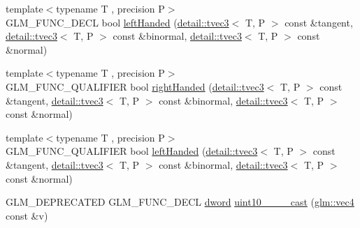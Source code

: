 \begin{DoxyCompactItemize}
\item 
{\footnotesize template$<$typename T , precision P$>$ }\\G\+L\+M\+\_\+\+F\+U\+N\+C\+\_\+\+D\+E\+CL bool \hyperlink{group__gtx__handed__coordinate__space_ga2c0882af0eabd0e39da5680931f586ed}{left\+Handed} (\hyperlink{structglm_1_1detail_1_1tvec3}{detail\+::tvec3}$<$ T, P $>$ const \&tangent, \hyperlink{structglm_1_1detail_1_1tvec3}{detail\+::tvec3}$<$ T, P $>$ const \&binormal, \hyperlink{structglm_1_1detail_1_1tvec3}{detail\+::tvec3}$<$ T, P $>$ const \&normal)
\item 
{\footnotesize template$<$typename T , precision P$>$ }\\G\+L\+M\+\_\+\+F\+U\+N\+C\+\_\+\+Q\+U\+A\+L\+I\+F\+I\+ER bool \hyperlink{group__gtx__handed__coordinate__space_ga16517e8a56cba5ba908e6eac6500ab94}{right\+Handed} (\hyperlink{structglm_1_1detail_1_1tvec3}{detail\+::tvec3}$<$ T, P $>$ const \&tangent, \hyperlink{structglm_1_1detail_1_1tvec3}{detail\+::tvec3}$<$ T, P $>$ const \&binormal, \hyperlink{structglm_1_1detail_1_1tvec3}{detail\+::tvec3}$<$ T, P $>$ const \&normal)
\item 
{\footnotesize template$<$typename T , precision P$>$ }\\G\+L\+M\+\_\+\+F\+U\+N\+C\+\_\+\+Q\+U\+A\+L\+I\+F\+I\+ER bool \hyperlink{group__gtx__handed__coordinate__space_ga2c0882af0eabd0e39da5680931f586ed}{left\+Handed} (\hyperlink{structglm_1_1detail_1_1tvec3}{detail\+::tvec3}$<$ T, P $>$ const \&tangent, \hyperlink{structglm_1_1detail_1_1tvec3}{detail\+::tvec3}$<$ T, P $>$ const \&binormal, \hyperlink{structglm_1_1detail_1_1tvec3}{detail\+::tvec3}$<$ T, P $>$ const \&normal)
\item 
G\+L\+M\+\_\+\+D\+E\+P\+R\+E\+C\+A\+T\+ED G\+L\+M\+\_\+\+F\+U\+N\+C\+\_\+\+D\+E\+CL \hyperlink{group__gtx__raw__data_ga1fc2589df6d44e923cd1820cf14805cf}{dword} \hyperlink{namespaceglm_ac9ff752cfc08f478e19615228e3e19fc}{uint10\+\_\+\_\+\_\+\_\+cast} (\hyperlink{group__core__types_ga5881b1b022d7fd1b7218f5916532dd02}{glm\+::vec4} const \&v)\hypertarget{namespaceglm_ac9ff752cfc08f478e19615228e3e19fc}{}\label{namespaceglm_ac9ff752cfc08f478e19615228e3e19fc}


\end{DoxyCompactItemize}
